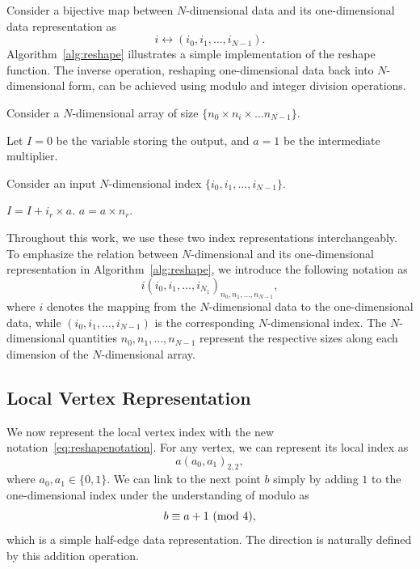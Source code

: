 Consider a bijective map between $N$-dimensional data and its one-dimensional data representation as
\begin{equation}
		  i \leftrightarrow (i_0, i_1 , \ldots, i_{N-1}).
\end{equation}
Algorithm~\ref{alg:reshape} illustrates a
simple implementation of the reshape function.
The inverse operation, reshaping one-dimensional data back into $N$-dimensional form, 
can be achieved using modulo and integer division operations.
\begin{algorithm}[htb]
\caption{Reshape $N$-dimensional data\label{alg:reshape}}
		  Consider a $N$-dimensional array of size $\{n_0\times n_i\times \ldots n_{N-1}\}$.
		  \vspace{0.3cm}

Let $I=0$ be the variable storing the output, and $a=1$ be the intermediate multiplier.
		  \vspace{0.3cm}

		  Consider an input $N$-dimensional index $\{i_0, i_1, \ldots, i_{N-1}\}$.
		  \vspace{0.3cm}

\begin{algorithmic} [1]
		  \vspace{0.3cm}
		  \State $I = I + i_r \times a$.
		  \vspace{0.3cm}
		  \State $a = a\times n_r$.
		  \vspace{0.3cm}
		  \EndFor
\end{algorithmic}
\end{algorithm}

Throughout this work, we use these two index representations interchangeably.
To emphasize the relation between $N$-dimensional
and its one-dimensional representation in Algorithm~\ref{alg:reshape}, we introduce the following notation as
\begin{equation}\label{eq:reshapenotation}
		  i(i_0, i_1, \ldots, i_{N_1})_{n_0, n_1, \ldots, n_{N-1}},
\end{equation}
where $i$ denotes the mapping from the $N$-dimensional data to the one-dimensional data, while $(i_0, i_1, \ldots, i_{N-1})$ 
is the corresponding $N$-dimensional index. The $N$-dimensional quantities $n_0, n_1, \ldots, n_{N-1}$ represent
the respective sizes along each dimension of the $N$-dimensional array. 

\subsection{Local Vertex Representation}
We now represent the local vertex index with the new notation~\eqref{eq:reshapenotation}.
For any vertex, we can represent its local index as
\begin{equation}
		  a(a_0,a_1)_{2,2},
\end{equation}
where $a_0, a_1 \in \{0,1\}$. We can link to the next point $b$ simply by
adding $1$ to the one-dimensional index under the understanding of modulo as
\begin{equation}
		  b \equiv a+1 \ (\mathrm{mod}\ 4),
\end{equation}
which is a simple half-edge data representation.
The direction is naturally defined by this addition operation.

